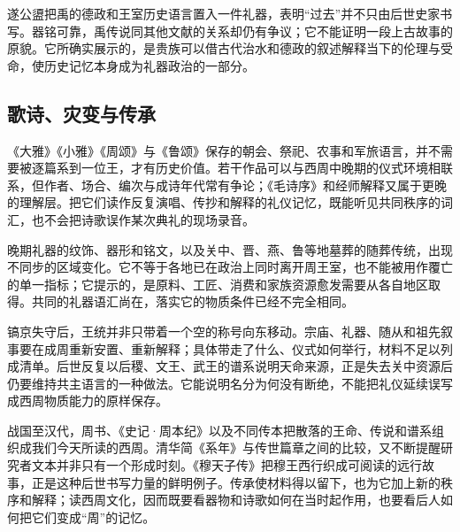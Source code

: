 遂公盨把禹的德政和王室历史语言置入一件礼器，表明“过去”并不只由后世史家书写。器铭可靠，禹传说同其他文献的关系却仍有争议；它不能证明一段上古故事的原貌。它所确实展示的，是贵族可以借古代治水和德政的叙述解释当下的伦理与受命，使历史记忆本身成为礼器政治的一部分。

\subsection{歌诗、灾变与传承}

《大雅》《小雅》《周颂》与《鲁颂》保存的朝会、祭祀、农事和军旅语言，并不需要被逐篇系到一位王，才有历史价值。若干作品可以与西周中晚期的仪式环境相联系，但作者、场合、编次与成诗年代常有争论；《毛诗序》和经师解释又属于更晚的理解层。把它们读作反复演唱、传抄和解释的礼仪记忆，既能听见共同秩序的词汇，也不会把诗歌误作某次典礼的现场录音。

晚期礼器的纹饰、器形和铭文，以及关中、晋、燕、鲁等地墓葬的随葬传统，出现不同步的区域变化。它不等于各地已在政治上同时离开周王室，也不能被用作覆亡的单一指标；它提示的，是原料、工匠、消费和家族资源愈发需要从各自地区取得。共同的礼器语汇尚在，落实它的物质条件已经不完全相同。

镐京失守后，王统并非只带着一个空的称号向东移动。宗庙、礼器、随从和祖先叙事要在成周重新安置、重新解释；具体带走了什么、仪式如何举行，材料不足以列成清单。后世反复以后稷、文王、武王的谱系说明天命来源，正是失去关中资源后仍要维持共主语言的一种做法。它能说明名分为何没有断绝，不能把礼仪延续误写成西周物质能力的原样保存。

战国至汉代，周书、《史记·周本纪》以及不同传本把散落的王命、传说和谱系组织成我们今天所读的西周。清华简《系年》与传世篇章之间的比较，又不断提醒研究者文本并非只有一个形成时刻。《穆天子传》把穆王西行织成可阅读的远行故事，正是这种后世书写力量的鲜明例子。传承使材料得以留下，也为它加上新的秩序和解释；读西周文化，因而既要看器物和诗歌如何在当时起作用，也要看后人如何把它们变成“周”的记忆。

